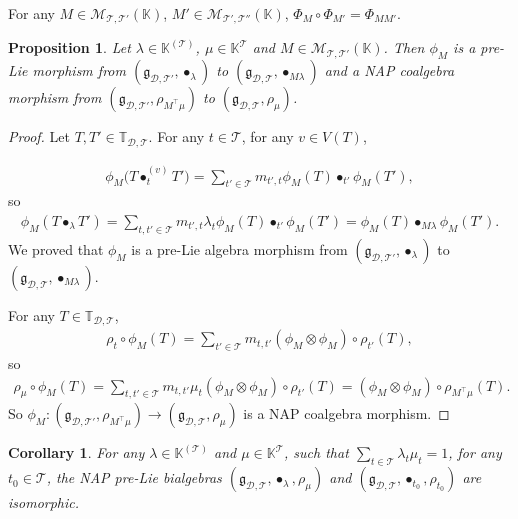\documentclass[pdftex]{sigma}
\numberwithin{equation}{section}
\newtheorem{Corollary}[Theorem]{Corollary}
\newtheorem{Proposition}[Theorem]{Proposition}
 { \theoremstyle{definition}
\newtheorem{Definition}[Theorem]{Definition}
\newtheorem{Note}[Theorem]{Note}
\newtheorem{Example}[Theorem]{Example}
\newtheorem{Remark}[Theorem]{Remark}
\newtheorem{Notation}[Theorem]{Notation}}
\newcommand{\K}{\mathbb{K}}
\newcommand{\T}{\mathcal{T}}
\newcommand{\D}{\mathcal{D}}
\newcommand{\g}{\mathfrak{g}}
\newcommand{\bfT}{\mathbb{T}}
\newcommand{\M}{\mathcal{M}}
\begin{document}
\begin{Remark}
For any $M\in \M_{\T,\T'}(\K)$, $M'\in \M_{\T',\T''}(\K)$, $\Phi_M\circ \Phi_{M'}=\Phi_{MM'}$.
\end{Remark}

\begin{Proposition}
Let $\lambda\in \K^{(\T)}$, $\mu\in \K^\T$ and $M\in \M_{\T,\T'}(\K)$.
Then $\phi_M$ is a pre-Lie morphism from $(\g_{\D,\T'},\bullet_\lambda)$ to $(\g_{\D,\T},\bullet_{M\lambda})$
and a NAP coalgebra morphism from $(\g_{\D,\T'},\rho_{M^\top \mu})$ to $(\g_{\D,\T},\rho_\mu)$.
\end{Proposition}

\begin{proof}
Let $T,T'\in \bfT_{\D,\T}$. For any $t\in \T$, for any $v\in V(T)$,
{\samepage\begin{gather*}
\phi_M\big(T\bullet_t^{(v)} T'\big)=\sum_{t'\in \T} m_{t',t} \phi_M(T)\bullet_{t'} \phi_M(T'),
\end{gather*}
so
\begin{gather*}
\phi_M(T\bullet_\lambda T')=\sum_{t,t'\in \T}m_{t',t}\lambda_t \phi_M(T)\bullet_{t'}\phi_M(T')=\phi_M(T)\bullet_{M\lambda}\phi_M(T').
\end{gather*}
We proved that $\phi_M$ is a pre-Lie algebra morphism from $(\g_{\D,\T'},\bullet_\lambda)$ to $(\g_{\D,\T},\bullet_{M\lambda})$.

}

For any $T \in \bfT_{\D,\T}$,
\begin{gather*}
\rho_t\circ \phi_M(T)=\sum_{t'\in \T} m_{t,t'} (\phi_M\otimes \phi_M)\circ \rho_{t'}(T),
\end{gather*}
so
\begin{gather*}
\rho_\mu\circ \phi_M(T)=\sum_{t,t'\in \T} m_{t,t'} \mu_t (\phi_M\otimes \phi_M)\circ \rho_{t'}(T)
=(\phi_M\otimes \phi_M)\circ \rho_{M^\top \mu}(T).
\end{gather*}
So $\phi_M\colon (\g_{\D,\T'},\rho_{M^\top \mu})\longrightarrow(\g_{\D,\T},\rho_\mu)$ is a NAP coalgebra morphism.
\end{proof}

\begin{Corollary} \label{cor18}
For any $\lambda \in\K^{(\T)}$ and $\mu\in \K^\T$,
such that $\sum_{t\in \T} \lambda_t\mu_t=1$, for any $t_0\in \T$,
the NAP pre-Lie bialgebras $(\g_{\D,\T},\bullet_\lambda,\rho_\mu)$ and $(\g_{\D,\T},\bullet_{t_0},\rho_{t_0})$ are isomorphic.
\end{Corollary}
\end{document}
